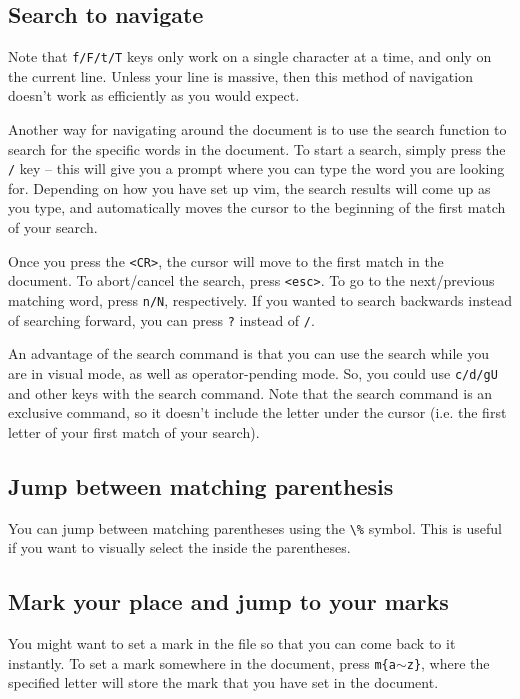 \subsection{Search to navigate}

Note that \verb|f/F/t/T| keys only work on a single character at a time, and only on the current line.
Unless your line is massive, then this method of navigation doesn't work as efficiently as you would expect.

Another way for navigating around the document is to use the search function to search for the specific words in the document.
To start a search, simply press the \verb|/| key -- this will give you a prompt where you can type the word you are looking for.
Depending on how you have set up vim, the search results will come up as you type, and automatically moves the cursor to the beginning of the first match of your search.

Once you press the \verb|<CR>|, the cursor will move to the first match in the document.
To abort/cancel the search, press \verb|<esc>|.
To go to the next/previous matching word, press \verb|n/N|, respectively.
If you wanted to search backwards instead of searching forward, you can press \verb|?| instead of \verb|/|.

An advantage of the search command is that you can use the search while you are in visual mode, as well as operator-pending mode.
So, you could use \verb|c/d/gU| and other keys with the search command.
Note that the search command is an exclusive command, so it doesn't include the letter under the cursor (i.e. the first letter of your first match of your search).

\subsection{Jump between matching parenthesis}

You can jump between matching parentheses using the \verb|\%| symbol.
This is useful if you want to visually select the inside the parentheses.

\subsection{Mark your place and jump to your marks}
\label{subsec:marks}

You might want to set a mark in the file so that you can come back to it instantly.
To set a mark somewhere in the document, press \verb|m{a|$\sim$\verb|z}|, where the specified letter will store the mark that you have set in the document.

